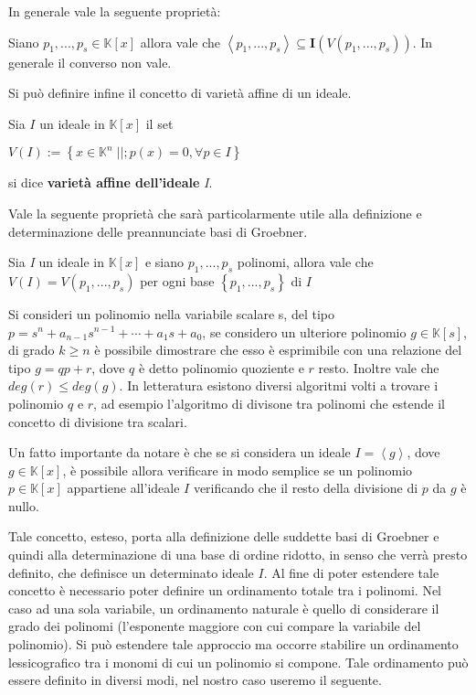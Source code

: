 In generale vale la seguente proprietà:
\begin{prop}
	Siano $p_1, ..., p_s \in \mathbb{K}[x]$ allora vale che $\left\langle p_1, ..., p_s \right\rangle \subseteq \mathbf{I}(V(p_1, ..., p_s))$. In generale il converso non vale.
\end{prop}
Si può definire infine il concetto di varietà affine di un ideale.
\begin{defn}
	Sia $I$ un ideale in $\mathbb{K}[x]$ il set
	\begin{center}
		$V(I) := \left\lbrace x \in \mathbb{K}^n \; | |; p(x) = 0, \forall p \in I \right\rbrace$
	\end{center}
	si dice \textbf{varietà affine dell'ideale} \textit{I}.
\end{defn}
Vale la seguente proprietà che sarà particolarmente utile alla definizione e determinazione delle preannunciate basi di Groebner.
\begin{prop}
	Sia \textit{I} un ideale in $\mathbb{K}[x]$ e siano $p_1, ..., p_s$ polinomi, allora vale che $V(I) = V(p_1, ..., p_s)$ per ogni base $\left\lbrace p_1, ..., p_s \right\rbrace$ di $I$
\end{prop}

Si consideri un polinomio nella variabile scalare s, del tipo $p = s^n + a_{n-1}s^{n-1} + \cdots + a_1s + a_0$, se considero un ulteriore polinomio $g \in \mathbb{K}[s]$, di grado $k \geq n$ è possibile dimostrare che esso è esprimibile con una relazione del tipo $g = qp + r$, dove $q$ è detto polinomio quoziente e $r$ resto. Inoltre vale che $deg(r) \le deg(g)$. In letteratura esistono diversi algoritmi volti a trovare i polinomio $q$ e $r$, ad esempio l'algoritmo di divisone tra polinomi che estende il concetto di divisione tra scalari.

Un fatto importante da notare è che se si considera un ideale $I = \left\langle g \right\rangle$, dove $g \in \mathbb{K}[x]$, è possibile allora verificare in modo semplice se un polinomio $p \in \mathbb{K}[x]$ appartiene all'ideale $I$ verificando che il resto della divisione di $p$ da $g$ è nullo.

Tale concetto, esteso, porta alla definizione delle suddette basi di Groebner e quindi alla determinazione di una base di ordine ridotto, in senso che verrà presto definito, che definisce un determinato ideale $I$. Al fine di poter estendere tale concetto è necessario poter definire un ordinamento totale tra i polinomi. Nel caso ad una sola variabile, un ordinamento naturale è quello di considerare il grado dei polinomi (l'esponente maggiore con cui compare la variabile del polinomio). Si può estendere tale approccio ma occorre stabilire un ordinamento lessicografico tra i monomi di cui un polinomio si compone. Tale ordinamento può essere definito in diversi modi, nel nostro caso useremo il seguente.

